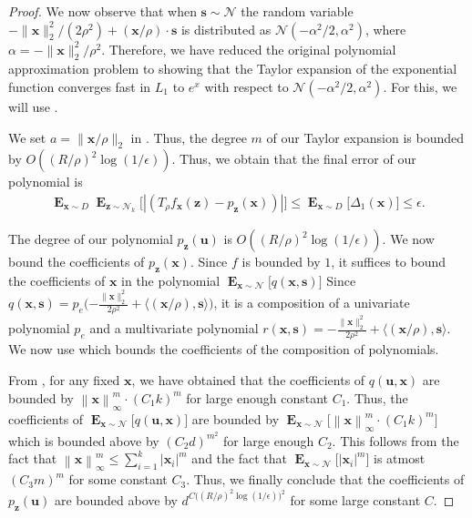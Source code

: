 \documentclass{theoretics}
\newcommand\twonorm[1]{\|#1\|_2}
\newcommand\norm[1]{\left\| #1 \right\|}
\renewcommand\vec[1]{\mathbf{#1}}
\DeclareMathOperator*{\E}{\mathbf{E}}
\newcommand{\normal}{\mathcal{N}}
\newcommand{\1}{\Ind}
\newcommand{\x}{\vec x}
\newcommand{\vu}{\vec u}
\newcommand{\z}{\vec z}
\newcommand{\Gauss}{\mathcal{N}}
\begin{document}
\begin{proof}
    We now observe that when $\vec s \sim \normal$ the random variable 
    $-\|\x\|_2^2/(2 \rho^2) + (\x/\rho) \cdot \vec s$ is distributed as
    $\normal(-\alpha^2/2, \alpha^2)$, where $\alpha = -\|\x\|_2^2/\rho^2$.  
    Therefore, we have reduced the original polynomial approximation problem to showing that 
    the Taylor expansion of the exponential function converges fast in $L_1$ to $e^x$ with 
    respect to $\normal(-\alpha^2/2, \alpha^2)$. For this, we will use .
    
We set $a=\twonorm{\x/\rho}$ in . Thus, the degree $m$ of our Taylor expansion is bounded by $O((R/\rho)^2\log(1/\epsilon))$. Thus, we obtain that the final error of our polynomial is
        \begin{align*}
            \E_{\x\sim D}\E_{\z\sim \Gauss_k}\bigl[|(T_{\rho}f_{\x}(\z)-p_{\z}(\x))|\bigr]\leq \E_{\x\sim D}\bigl[\Delta_1(\x)\bigr]\leq \epsilon.
        \end{align*}
        
        The degree of our polynomial $p_{\z}(\vu)$ is $O((R/\rho)^2\log(1/\epsilon))$.  We now bound the coefficients of $p_{\z}(\x)$. Since $f$ is bounded by $1$, it suffices to bound the coefficients of $\x$ in the polynomial $\E_{\x\sim \Gauss}\bigl[q(\x,\vec s)\bigr]$ Since $q(\x,\vec s)=p_e\bigl({-\frac{\twonorm{\x}^2}{2\rho^2}+\langle (\x/\rho),\vec s\rangle}\bigr)$, it is a composition of a univariate polynomial $p_e$ and a multivariate polynomial $r(\x,\vec s)={-\frac{\twonorm{\x}^2}{2\rho^2}+\langle (\x/\rho),\vec s\rangle}$. We now use  which bounds the coefficients of the composition of polynomials. 
    
From , for any fixed $\x$, we have obtained that the coefficients of $q(\vu,\x)$ are bounded by $\norm{\x}_{\infty}^{m}\cdot (C_1k)^{m}$ for large enough constant $C_1$. Thus, the coefficients of $\E_{\x\sim \Gauss}\bigl[q(\vu,\x)\bigr]$ are bounded by $\E_{\x\sim \Gauss}\bigl[\norm{\x}_{\infty}^m\cdot (C_1k)^{m}\bigr]$ which is bounded above by $(C_2d)^{m^2}$ for large enough $C_2$. This follows from the fact that $\norm{\x}_{\infty}^m\leq \sum_{i=1}^{k}|\x_i|^m$ and the fact that $\E_{\x\sim \Gauss}\bigl[|\x_i|^m\bigr]$ is atmost $(C_3 m)^m$ for some constant $C_3$. Thus, we finally conclude that the coefficients of $p_{\z}(\vu)$ are bounded above by $d^{C\bigl((R/\rho)^2\log(1/\epsilon)\bigr)^2}$ for some large constant $C$.
\end{proof}
\end{document}

